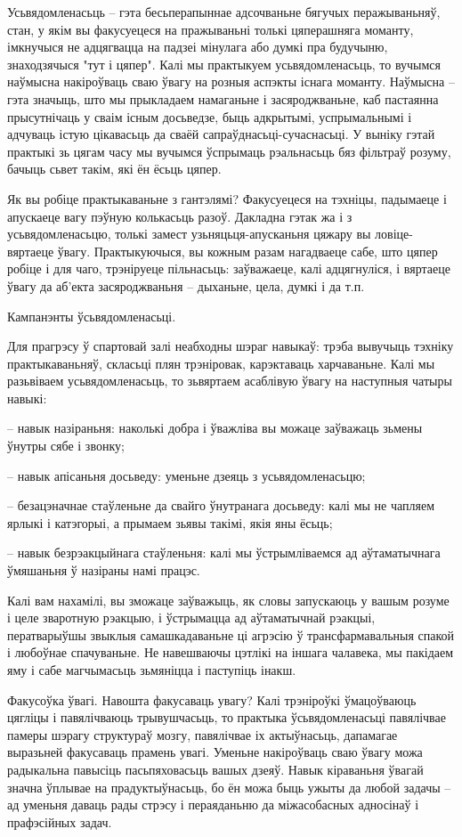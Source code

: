 Усьвядомленасьць – гэта бесьперапыннае адсочваньне бягучых перажываньняў, стан, у якім вы факусуецеся на пражываньні толькі цяперашняга моманту, імкнучыся не адцягвацца на падзеі мінулага або думкі пра будучыню, знаходзячыся "тут і цяпер". Калі мы практыкуем усьвядомленасьць, то вучымся наўмысна накіроўваць сваю ўвагу на розныя аспэкты існага моманту. Наўмысна – гэта значыць, што мы прыкладаем намаганьне і засяроджваньне, каб пастаянна прысутнічаць у сваім існым досьведзе, быць адкрытымі, успрымальнымі і адчуваць істую цікавасьць да сваёй сапраўднасьці-сучаснасьці. У выніку гэтай практыкі зь цягам часу мы вучымся ўспрымаць рэальнасьць бяз фільтраў розуму, бачыць сьвет такім, які ён ёсьць цяпер.

Як вы робіце практыкаваньне з гантэлямі? Факусуецеся на тэхніцы, падымаеце і апускаеце вагу пэўную колькасьць разоў. Дакладна гэтак жа і з усьвядомленасьцю, толькі замест узьняцьця-апусканьня цяжару вы ловіце-вяртаеце ўвагу. Практыкуючыся, вы кожным разам нагадваеце сабе, што цяпер робіце і для чаго, трэніруеце пільнасьць: заўважаеце, калі адцягнуліся, і вяртаеце ўвагу да аб'екта засяроджваньня – дыханьне, цела, думкі і да т.п.

Кампанэнты ўсьвядомленасьці.

Для прагрэсу ў спартовай залі неабходны шэраг навыкаў: трэба вывучыць тэхніку практыкаваньняў, скласьці плян трэніровак, карэктаваць харчаваньне. Калі мы разьвіваем усьвядомленасьць, то зьвяртаем асаблівую ўвагу на наступныя чатыры навыкі: 

– навык назіраньня: наколькі добра і ўважліва вы можаце заўважаць зьмены ўнутры сябе і звонку;

– навык апісаньня досьведу: уменьне дзеяць з усьвядомленасьцю;

– безацэначнае стаўленьне да свайго ўнутранага досьведу: калі мы не чапляем ярлыкі і катэгорыі, а прымаем зьявы такімі, якія яны ёсьць;

– навык безрэакцыйнага стаўленьня: калі мы ўстрымліваемся ад аўтаматычнага ўмяшаньня ў назіраны намі працэс.

Калі вам нахамілі, вы зможаце заўважыць, як словы запускаюць у вашым розуме і целе зваротную рэакцыю, і ўстрымацца ад аўтаматычнай рэакцыі, ператварыўшы звыклыя самашкадаваньне ці агрэсію ў трансфармавальныя спакой і любоўнае спачуваньне. Не навешваючы цэтлікі на іншага чалавека, мы пакідаем яму і сабе магчымасьць зьмяніцца і паступіць інакш.

Факусоўка ўвагі. Навошта факусаваць увагу? Калі трэніроўкі ўмацоўваюць цягліцы і павялічваюць трывушчасьць, то практыка ўсьвядомленасьці павялічвае памеры шэрагу структураў мозгу, павялічвае іх актыўнасьць, дапамагае выразьней факусаваць прамень увагі. Уменьне накіроўваць сваю ўвагу можа радыкальна павысіць пасьпяховасьць вашых дзеяў. Навык кіраваньня ўвагай значна ўплывае на прадуктыўнасьць, бо ён можа быць ужыты да любой задачы – ад уменьня даваць рады стрэсу і пераяданьню да міжасобасных адносінаў і прафэсійных задач.

